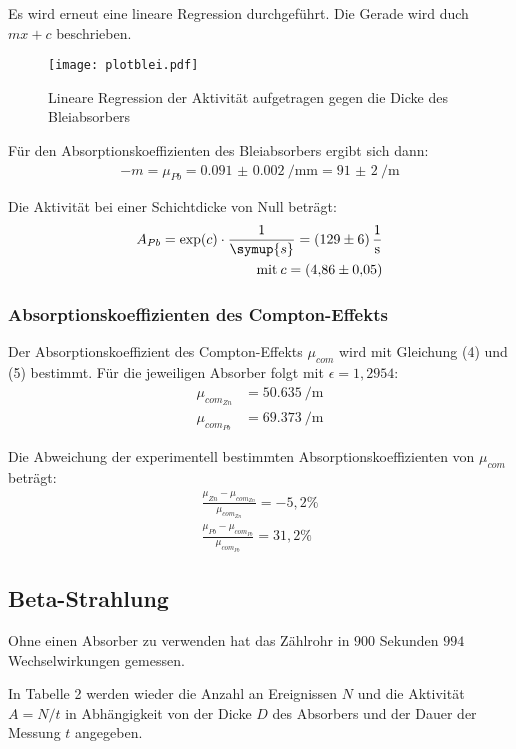 Es wird erneut eine lineare Regression durchgeführt. Die Gerade wird duch $mx + c$ beschrieben.

\begin{figure}[H]
  \centering
  \texttt{[image: plotblei.pdf]}
  \caption{Lineare Regression der Aktivität aufgetragen gegen die Dicke des Bleiabsorbers}
  \label{fig:plot}
\end{figure}


Für den Absorptionskoeffizienten des Bleiabsorbers ergibt sich dann:
\begin{align*}
  -m = \mu_{Pb} = \SI{0.091(2)}{\per\milli\meter} = \SI{91(2)}{\per\meter}
\end{align*}

Die Aktivität bei einer Schichtdicke von Null beträgt:
\begin{align*}
  A_{Pb} = \exp(c) \cdot \frac{1}{\symup{s}} = \SI{129(6)}{\per\second} \\
  \text{mit} \: c = \SI{4.86(5)}{}
\end{align*}

\subsubsection{Absorptionskoeffizienten des Compton-Effekts}

Der Absorptionskoeffizient des Compton-Effekts $\mu_{com}$ wird mit Gleichung (4) und (5) bestimmt. Für die jeweiligen Absorber
folgt mit $\epsilon = 1,2954$:
\begin{align*}
\mu_{com_{Zn}} &= \SI{50,635}{\per\meter}  \\
\mu_{com_{Pb}} &= \SI{69,373}{\per\meter}
\end{align*}

Die Abweichung der experimentell bestimmten Absorptionskoeffizienten von $\mu_{com}$ beträgt:
\begin{align*}
  \frac{\mu_{Zn}- \mu_{com_{Zn}}}{\mu_{com_{Zn}}} = -5,2 \% \\
  \frac{\mu_{Pb}- \mu_{com_{Pb}}}{\mu_{com_{Pb}}} = 31,2 \%
\end{align*}


\subsection{Beta-Strahlung}

Ohne einen Absorber zu verwenden hat das Zählrohr in $900$ Sekunden $994$ Wechselwirkungen gemessen.

In Tabelle 2 werden wieder die Anzahl an Ereignissen $N$ und die Aktivität $A = N/t$ in Abhängigkeit von der Dicke $D$ des Absorbers und der
Dauer der Messung $t$ angegeben.

